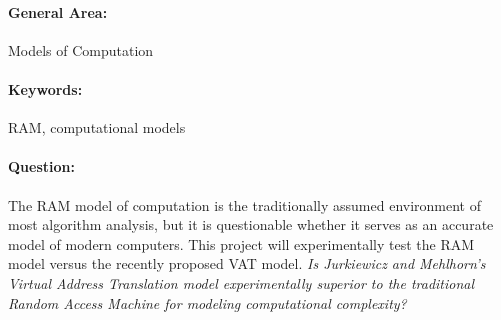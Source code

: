 \maketitle

\paragraph{General Area:} Models of Computation

\paragraph{Keywords:} RAM, computational models

\paragraph{Question:} The RAM model of computation is the traditionally
assumed environment of most algorithm analysis, but it is questionable whether
it serves as an accurate model of modern computers. This project will
experimentally test the RAM model versus the recently proposed VAT model.
\em{Is Jurkiewicz and Mehlhorn's Virtual Address Translation model
experimentally superior to the traditional Random Access Machine for modeling
computational complexity?}

